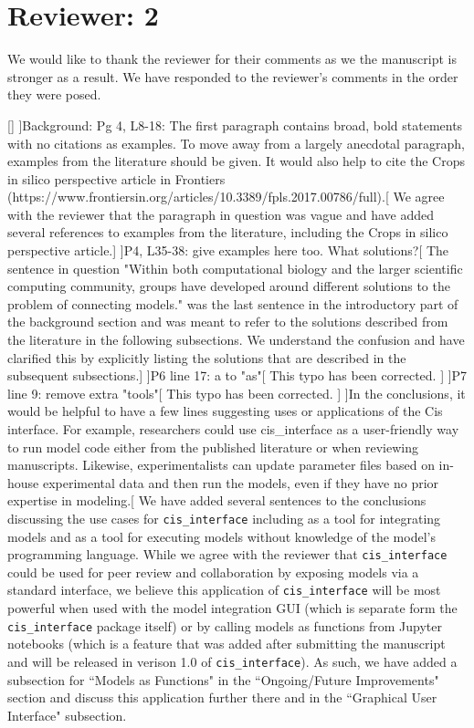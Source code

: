 \documentclass[11pt]{article}
\newcommand{\pkg}{{\tt cis\_interface}{}}
\newcommand{\cmark}{\ding{51}}%
\newcommand{\done}{\makebox[0pt][l]{$\square$}{\raisebox{2pt}{\large\hspace{1pt}\cmark}}%
\hspace{-2.5pt}}
\begin{document}
\section{Reviewer: 2}

We would like to thank the reviewer for their comments as we the manuscript is stronger as a result. We have responded to the reviewer's comments in the order they were posed.
%
\begin{comments}
[]
\comment[\done]{Background: Pg 4, L8-18: The first paragraph contains broad, bold statements with no citations as examples. To move away from a largely anecdotal paragraph, examples from the literature should be given. It would also help to cite the Crops in silico perspective article in Frontiers (https://www.frontiersin.org/articles/10.3389/fpls.2017.00786/full).}[%
%
We agree with the reviewer that the paragraph in question was vague and have added several references to examples from the literature, including the Crops in silico perspective article.]
\comment[\done]{P4, L35-38: give examples here too. What solutions?}[%
%
The sentence in question "Within both computational biology and the larger scientific computing community, groups have developed around different solutions to the problem of connecting models." was the last sentence in the introductory part of the background section and was meant to refer to the solutions described from the literature in the following subsections. We understand the confusion and have clarified this by explicitly listing the solutions that are described in the subsequent subsections.]
\comment[\done]{P6 line 17: a to "as"}[%
%
This typo has been corrected.
]
\comment[\done]{P7 line 9: remove extra "tools"}[%
%
This typo has been corrected.
]
\comment[\done]{In the conclusions, it would be helpful to have a few lines suggesting uses or applications of the Cis interface. For example, researchers could use cis{\_}interface as a user-friendly way to run model code either from the published literature or when reviewing manuscripts. Likewise, experimentalists can update parameter files based on in-house experimental data and then run the models, even if they have no prior expertise in modeling.}[%
%
We have added several sentences to the conclusions discussing the use cases for {\pkg} including as a tool for integrating models and as a tool for executing models without knowledge of the model's programming language. While we agree with the reviewer that {\pkg} could be used for peer review and collaboration by exposing models via a standard interface, we believe this application of {\pkg} will be most powerful when used with the model integration GUI (which is separate form the {\pkg} package itself) or by calling models as functions from Jupyter notebooks (which is a feature that was added after submitting the manuscript and will be released in verison 1.0 of {\pkg}). As such, we have added a subsection for ``Models as Functions" in the ``Ongoing/Future Improvements" section and discuss this application further there and in the ``Graphical User Interface" subsection.

\end{comments}
\end{document}
